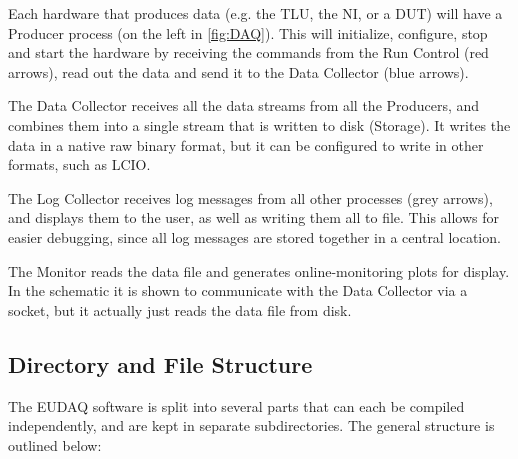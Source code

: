 Each hardware that produces data (e.g. the \gls{TLU}, the \gls{NI}, or a \gls{DUT}) will have a Producer process (on the left in \autoref{fig:DAQ}).
This will initialize, configure, stop and start the hardware by receiving the commands from the Run Control (red arrows), read out the data and send it to the Data Collector (blue arrows).

The Data Collector receives all the data streams from all the Producers,
and combines them into a single stream that is written to disk (Storage).
It writes the data in a native raw binary format,
but it can be configured to write in other formats, such as \gls{LCIO}.

The Log Collector receives log messages from all other processes (grey arrows),
and displays them to the user, as well as writing them all to file.
This allows for easier debugging, since all log messages are stored together in a central location.

The Monitor reads the data file and generates online-monitoring plots for display.
In the schematic it is shown to communicate with the Data Collector via a socket,
but it actually just reads the data file from disk.

\subsection{Directory and File Structure}
The EUDAQ software is split into several parts that can each be compiled independently,
and are kept in separate subdirectories.
The general structure is outlined below:

